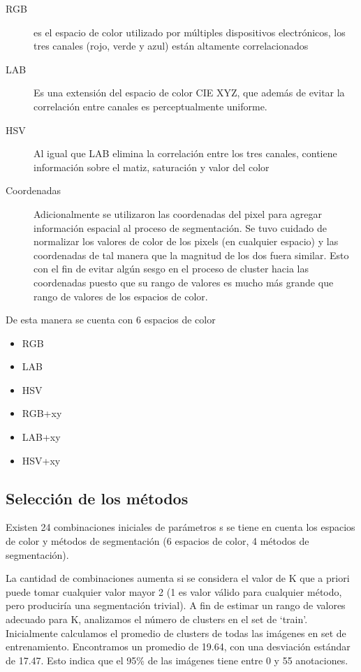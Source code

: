 \documentclass[10pt,twocolumn,letterpaper]{article}
\begin{document}
\begin{description}
\item[RGB] es el espacio de color utilizado por múltiples dispositivos electrónicos, los tres canales (rojo, verde y azul) están altamente correlacionados
\item[LAB] Es una extensión del espacio de color CIE XYZ, que además de evitar la correlación entre canales es perceptualmente uniforme.
\item[HSV] Al igual que LAB elimina la correlación entre los tres canales,  contiene información sobre el matiz, saturación y valor del color
\item[Coordenadas] Adicionalmente se utilizaron las coordenadas del pixel para agregar información espacial al proceso de segmentación.  Se tuvo cuidado de  normalizar los valores de color de los pixels (en cualquier espacio) y las coordenadas de tal manera que la magnitud de los dos fuera similar. Esto con el fin de evitar algún sesgo en el proceso de cluster hacia las coordenadas puesto que su rango de valores es mucho más grande que rango de valores de los espacios de color.
\end{description}
De esta manera se cuenta con 6 espacios de color

\begin{itemize}
\item RGB
\item LAB
\item HSV
\item RGB+xy
\item LAB+xy
\item HSV+xy
\end{itemize}


\subsection{Selección de los métodos}

Existen 24 combinaciones iniciales de parámetros s se tiene en cuenta los espacios de color y métodos de segmentación (6 espacios de color, 4 métodos de segmentación).

La cantidad de combinaciones aumenta si se considera  el valor de K que a priori puede tomar cualquier valor mayor 2 (1 es valor válido para cualquier método, pero produciría una segmentación trivial). A fin de estimar un rango de valores adecuado para K, analizamos el número de clusters en el set de ‘train’. Inicialmente calculamos el promedio de clusters de todas las imágenes en set de entrenamiento. Encontramos un promedio de 19.64, con una desviación estándar de 17.47. Esto indica que el 95\% de las imágenes tiene entre 0 y 55 anotaciones.
\end{document}
